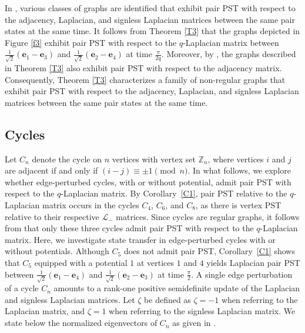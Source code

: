 \documentclass[12pt,a4paper]{article}
\def \e {{\mathbf e}}
\begin{document}
In \cite{pal9}, various classes of graphs are identified that exhibit pair PST with respect to the adjacency, Laplacian, and signless Laplacian matrices between the same pair states at the same time. It follows from Theorem \ref{T3} that the graphs depicted in Figure \ref{f3} exhibit pair PST with respect to the $q$-Laplacian matrix between $\frac{1}{\sqrt{2}}\left( \mathbf{e}_1 - \mathbf{e}_3 \right)$ and $\frac{1}{\sqrt{2}}\left( \mathbf{e}_2 - \mathbf{e}_4 \right)$ at time $\frac{\pi}{2q}$. Moreover, by \cite[Theorem 2]{pal7}, the graphs described in Theorem \ref{T3} also exhibit pair PST with respect to the adjacency matrix. Consequently, Theorem \ref{T3} characterizes a family of non-regular graphs that exhibit pair PST with respect to the adjacency, Laplacian, and signless Laplacian matrices between the same pair states at the same time.


\subsection{Cycles}
Let $C_n$ denote the cycle on $n$ vertices with vertex set $\mathbb{Z}_n$, where vertices $i$ and $j$ are adjacent if and only if $ (i-j) \equiv \pm1 \pmod{n}$. In what follows, we explore whether edge-perturbed cycles, with or without potential, admit pair PST with respect to the $q$-Laplacian matrix. By Corollary~\ref{C1}, pair PST relative to the $q$-Laplacian matrix occurs in the cycles $C_4$, $C_6$, and $C_8$, as there is vertex PST relative to their respective $\mathscr{L}_{-}$ matrices. Since cycles are regular graphs, it follows from \cite{kim} that only these three cycles admit pair PST with respect to the $q$-Laplacian matrix. Here, we investigate state transfer in edge-perturbed cycles with or without potentials. Although $C_5$ does not admit pair PST, Corollary~\ref{C1} shows that $C_5$ equipped with a potential $1$ at vertices $1$ and $4$ yields Laplacian pair PST between $\frac{1}{\sqrt{2}}(\e_1 - \e_4)$ and $\frac{1}{\sqrt{2}}(\e_2 - \e_3)$ at time $\frac{\pi}{2}$. A single edge perturbation of a cycle $C_n$ amounts to a rank-one positive semidefinite update of the Laplacian and signless Laplacian matrices. Let $\zeta$ be defined as $\zeta = -1$ when referring to the Laplacian matrix, and $\zeta = 1$ when referring to the signless Laplacian matrix. We state below the normalized eigenvectors of $C_n$ as given in \cite[Lemma 6.4]{god25}.
\end{document}
